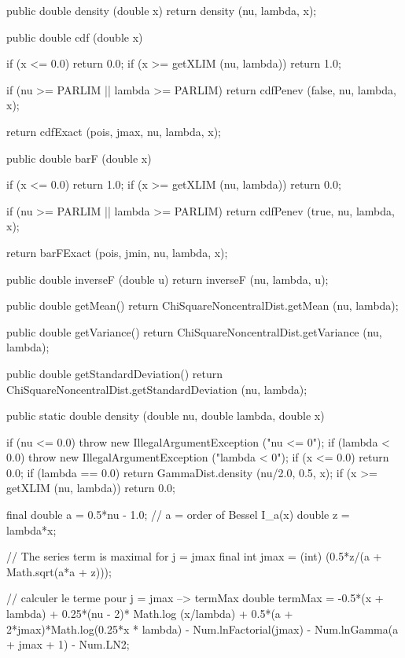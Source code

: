 \begin{code}\begin{hide}

   public double density (double x) {
      return density (nu, lambda, x);
   }

   public double cdf (double x) {
      if (x <= 0.0)
         return 0.0;
      if (x >= getXLIM (nu, lambda))
         return 1.0;

      if (nu >= PARLIM || lambda >= PARLIM)
         return cdfPenev (false, nu, lambda, x);

      return cdfExact (pois, jmax, nu, lambda, x);
   }

   public double barF (double x) {
      if (x <= 0.0)
         return 1.0;
      if (x >= getXLIM (nu, lambda))
         return 0.0;

      if (nu >= PARLIM || lambda >= PARLIM)
         return cdfPenev (true, nu, lambda, x);

      return barFExact (pois, jmin, nu, lambda, x);
   }

   public double inverseF (double u) {
      return inverseF (nu, lambda, u);
   }

   public double getMean() {
      return ChiSquareNoncentralDist.getMean (nu, lambda);
   }

   public double getVariance() {
      return ChiSquareNoncentralDist.getVariance (nu, lambda);
   }

   public double getStandardDeviation() {
      return ChiSquareNoncentralDist.getStandardDeviation (nu, lambda);
   }\end{hide}

   public static double density (double nu, double lambda, double x)\begin{hide} {
      if (nu <= 0.0)
         throw new IllegalArgumentException ("nu <= 0");
      if (lambda < 0.0)
         throw new IllegalArgumentException ("lambda < 0");
      if (x <= 0.0)
         return 0.0;
      if (lambda == 0.0)
         return GammaDist.density (nu/2.0, 0.5, x);
      if (x >= getXLIM (nu, lambda))
         return 0.0;

      final double a = 0.5*nu - 1.0;      // a = order of Bessel I_a(x)
      double z = lambda*x;

      // The series term is maximal for j = jmax
      final int jmax = (int) (0.5*z/(a + Math.sqrt(a*a + z)));

      // calculer le terme pour j = jmax --> termMax
      double termMax = -0.5*(x + lambda) + 0.25*(nu - 2)* Math.log (x/lambda) +
         0.5*(a + 2*jmax)*Math.log(0.25*x * lambda) - Num.lnFactorial(jmax) -
         Num.lnGamma(a + jmax + 1) - Num.LN2;

}
\end{hide}
\end{code}
